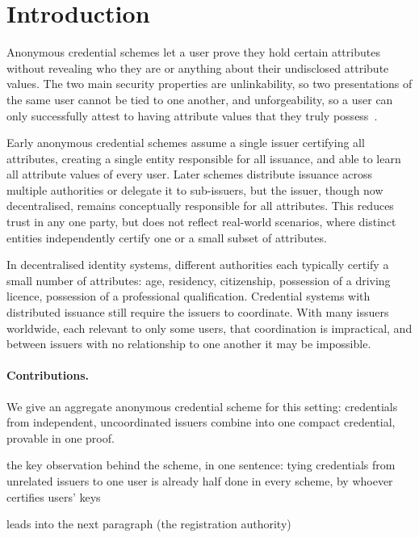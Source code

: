 \section{Introduction}

Anonymous credential schemes let a user prove they hold certain attributes
without revealing who they are or anything about their undisclosed attribute
values. The two main security properties are unlinkability, so two presentations
of the same user cannot be tied to one another, and unforgeability, so a user
can only successfully attest to having attribute values that they truly
possess~\cite{EC:CamLys01}.

Early anonymous credential schemes assume a single issuer certifying all
attributes, creating a single entity responsible for all issuance, and able to
learn all attribute values of every user. Later schemes distribute issuance
across multiple authorities or delegate it to sub-issuers, but the issuer,
though now decentralised, remains conceptually responsible for all attributes.
This reduces trust in any one party, but does not reflect real-world scenarios,
where distinct entities independently certify one or a small subset of
attributes.

In decentralised identity systems, different authorities each typically certify
a small number of attributes: age, residency, citizenship, possession of a
driving licence, possession of a professional qualification. Credential systems
with distributed issuance still require the issuers to coordinate. With many
issuers worldwide, each relevant to only some users, that coordination is
impractical, and between issuers with no relationship to one another it may be
impossible.

\paragraph{Contributions.} We give an aggregate anonymous credential scheme for this setting: credentials
from independent, uncoordinated issuers combine into one compact credential,
provable in one proof.
\begin{outline}
  \item the key observation behind the scheme, in one sentence: tying credentials from unrelated issuers to one user is already half done in every scheme, by whoever certifies users' keys
  \item leads into the next paragraph (the registration authority)
\end{outline}

